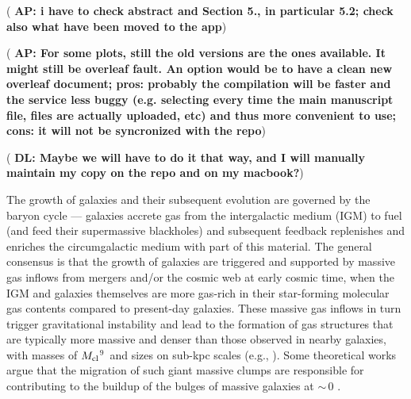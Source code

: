 \IfFileExists{emulateapjlegacy.cls}{\documentclass[iop]{emulateapjlegacy}}{\documentclass[iop]{emulateapj}}
\newcommand{\AP}[1]{({\bf \color{apcolor} AP: #1})}
\newcommand{\DL}[1]{({\bf \color{dlcolor} DL: #1})}
\begin{document}
\AP{i have to check abstract and Section 5., in particular 5.2; check also what have been moved to the app}

\AP{For some plots, still the old versions are the ones available. It might still be overleaf fault. An option would be to have a clean new overleaf document; pros: probably the compilation will be faster and the service less buggy (e.g. selecting every time the main manuscript file, files are actually uploaded, etc) and thus more convenient to use; cons: it will not be syncronized with the repo}

\DL{Maybe we will have to do it that way, and I will manually maintain my copy on the repo and on my macbook?}

The growth of galaxies and their subsequent evolution are governed by the baryon cycle --- galaxies accrete gas from the intergalactic medium (IGM) to fuel \SF (and feed their supermassive blackholes) and subsequent feedback replenishes and enriches the circumgalactic medium with part of this material. The general consensus is that the growth of \highz galaxies are triggered and supported by massive gas inflows from mergers and/or the cosmic web at early cosmic time, when the IGM and galaxies themselves are more gas-rich in their star-forming molecular gas contents compared to present-day galaxies.
%
These massive gas inflows in turn trigger gravitational instability and lead
to the formation of gas structures that are typically more massive and denser than those
observed in nearby galaxies, with masses of $M_{\rm cl}$$^9$\,\Msun
and sizes on sub-kpc scales (e.g., \citealt{Gabor13a, Hopkins14a, Inoue16a}).
Some theoretical works argue that the
migration of such giant massive clumps are responsible for contributing to the
buildup of the bulges of massive galaxies at \z$\sim$\,0 \citep[e.g.,][]{Ceverino10a}.
\end{document}
